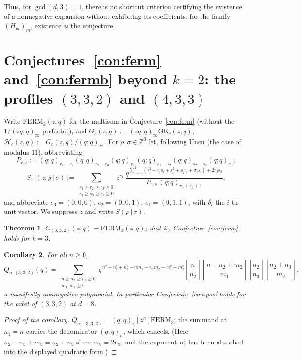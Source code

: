 \documentclass[11pt]{article}
\newtheorem{theorem}{Theorem}[section]
\newtheorem{corollary}[theorem]{Corollary}
\newcommand{\qbin}[2]{\genfrac{[}{]}{0pt}{}{#1}{#2}}
\newcommand{\poch}[1]{(q;q)_{#1}}
\newcommand{\GK}{\mathrm{GK}}
\newcommand{\FERM}{\mathrm{FERM}}
\newcommand{\ZZ}{\mathbb{Z}}
\begin{document}
Thus, for $\gcd(d,3)=1$, there is no shortcut criterion certifying the
existence of a nonnegative expansion without exhibiting its coefficients:
for the family $(H_m)_m$, existence \emph{is} the conjecture.

\section{Conjectures~\ref{con:ferm} and~\ref{con:fermb} beyond $k=2$:
the profiles $(3,3,2)$ and $(4,3,3)$}\label{sec:d8}

Write $\FERM_k(z,q)$ for the multisum in Conjecture~\ref{con:ferm}
(without the $1/(zq;q)_\infty$ prefactor), and
$G_c(z,q):=(zq;q)_\infty\GK_c(z,q)$,
$\mathcal{H}_c(z,q):=G_c(z,q)/\poch{\infty}$. For $\rho,\sigma\in\ZZ^3$
let, following Uncu \cite[Eq.~(2.8)]{Uncu23} (the case of modulus $11$),
abbreviating
\[
P_{r,s}:=\poch{r_1-r_2}\poch{r_2-r_3}\poch{r_3}\,
\poch{s_1-s_2}\poch{s_2-s_3}\poch{s_3},
\]
\begin{equation}\label{eq:S11}
S_{11}(z;\rho\,|\,\sigma):=
\sum_{\substack{r_1\ge r_2\ge r_3\ge 0\\ s_1\ge s_2\ge s_3\ge 0}}
z^{r_1}\,
\frac{q^{\sum_{i=1}^{3}(r_i^2-r_is_i+s_i^2+\rho_ir_i+\sigma_is_i)+2r_3s_3}}
{P_{r,s}\,\poch{r_3+s_3+1}} ,
\end{equation}
and abbreviate $e_3=(0,0,0)$, $e_2=(0,0,1)$, $e_1=(0,1,1)$, with
$\delta_i$ the $i$-th unit vector. We suppress $z$ and write
$S(\rho\,|\,\sigma)$.

\begin{theorem}\label{thm:d8}
$G_{(3,3,2)}(z,q)=\FERM_3(z,q)$; that is, Conjecture~\ref{con:ferm} holds
for $k=3$.
\end{theorem}

\begin{corollary}\label{cor:d8pos}
For all $n\ge 0$,
\[
Q_{n,(3,3,2)}(q)=
\sum_{\substack{n\ge n_2\ge n_3\ge 0\\ m_1,m_2\ge 0}}
q^{\,n^2+n_2^2+n_3^2-nm_1-n_2m_2+m_1^2+m_2^2}
\qbin{n}{n_2}\qbin{n-n_2+m_2}{m_1}\qbin{n_2}{n_3}\qbin{n_2+n_3}{m_2},
\]
a manifestly nonnegative polynomial. In particular
Conjecture~\ref{con:pos} holds for the orbit of $(3,3,2)$ at $d=8$.
\end{corollary}

\begin{proof}[Proof of the corollary]
$Q_{n,(3,3,2)}=\poch{n}[z^n]\FERM_3$; the summand at $n_1=n$ carries the
denominator $\poch{n}$, which cancels. (Here
$n_2-n_3+m_3=n_2+n_3$ since $m_3=2n_3$, and the exponent $n_3^2$ has been
absorbed into the displayed quadratic form.)
\end{proof}
\end{document}
